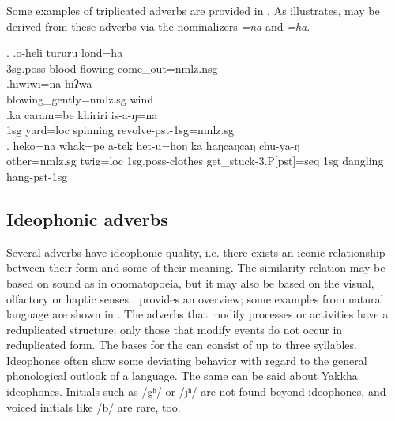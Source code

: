 Some examples of triplicated adverbs are provided in \Next. As \Next[b] illustrates,  may be derived from these adverbs via the nominalizers \emph{=na} and \emph{=ha}.  

 \ex. \ag.o-heli tururu lond=ha\\	
	{\sc 3sg.poss}-blood flowing	come\_out{\sc [pst]=nmlz.nsg}	\\
	 \bg.hiwiwi=na hiʔwa\\
	blowing\_gently{\sc =nmlz.sg}	wind\\
	 \bg.ka caram=be khiriri is-a-ŋ=na \\
		{\sc 1sg}	yard{\sc =loc} spinning 	revolve{\sc -pst-1sg=nmlz.sg}\\
	 \bg. heko=na         whak=pe      a-tek              het-u=hoŋ              ka  haŋcaŋcaŋ chu-ya-ŋ\\
	other{\sc =nmlz.sg} twig{\sc =loc} {\sc 1sg.poss-}clothes get\_stuck{\sc -3.P[pst]=seq} {\sc 1sg} dangling hang{\sc -pst-1sg}\\
	  
	
\subsection{Ideophonic adverbs}\label{sec-ideophone}

Several adverbs have ideophonic quality, i.e. there exists an iconic relationship between their form and some  of their meaning. The similarity relation may be based on sound as in onomatopoeia, but it may also be based on the visual, olfactory or haptic senses \citep{Caughley1997_Vowel}.  provides an overview; some examples from natural language are shown in  \Next. The adverbs that modify processes or activities have a reduplicated structure; only those that modify  events do not occur in reduplicated form. The bases for the  can consist of up to three syllables. Ideophones often show some deviating behavior with regard to the general phonological outlook of a language. The same can be said about Yakkha ideophones. Initials such as /gʰ/ or /jʰ/ are not found beyond ideophones, and voiced initials like /b/ are rare, too.


